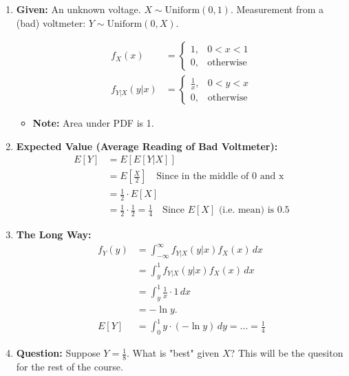 \begin{example}
    \begin{enumerate}
        \item \textbf{Given:} An unknown voltage. \( X \sim \text{Uniform}(0,1) \). Measurement from a (bad) voltmeter: \( Y \sim \text{Uniform}(0, X) \).
    
        \begin{align*}
            f_X(x) &= 
            \begin{cases} 
                1, & 0 < x < 1 \\ 
                0, & \text{otherwise}
            \end{cases} \\
            f_{Y|X}(y|x) &= 
            \begin{cases} 
                \frac{1}{x}, & 0 < y < x \\ 
                0, & \text{otherwise}
            \end{cases}
        \end{align*}
        \begin{itemize}
            \item \textbf{Note:} Area under PDF is 1.
        \end{itemize}


    
        \item \textbf{Expected Value (Average Reading of Bad Voltmeter):}
        \begin{align*}
            E[Y] &= E[E[Y|X]] \\
                 &= E\left[\frac{X}{2}\right] \quad \text{Since in the middle of 0 and x}\\
                 &= \frac{1}{2} \cdot E[X] \\ 
                 &= \frac{1}{2} \cdot \frac{1}{2} = \frac{1}{4} \quad \text{Since $E[X]$ (i.e. mean) is 0.5}
        \end{align*}
    
        \item \textbf{The Long Way:}
        \begin{align*}
            f_Y(y) &= \int_{-\infty}^{\infty} f_{Y|X}(y|x) f_X(x) \, dx \\
                   &= \int_{y}^1 f_{Y|X}(y|x) f_X(x) \, dx \\
                   &= \int_{y}^1 \frac{1}{x} \cdot 1 \, dx \\
                   &= -\ln y. \\
            E[Y] &= \int_{0}^1 y \cdot (-\ln y) \, dy = \dots = \frac{1}{4}
        \end{align*}
    
        \item \textbf{Question:} Suppose \( Y = \frac{1}{8} \). What is "best" given \( X \)? This will be the quesiton for the rest of the course.
    \end{enumerate}    
\end{example}
